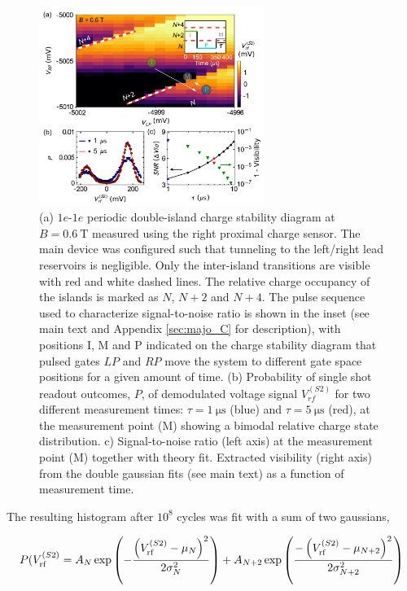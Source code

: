 \begin{figure}
	\includegraphics[width=0.65\textwidth]{Fig5-44.pdf}
	\caption[Charge sensitivity and signal-to-noise ratio]{(a) $1e$-$1e$ periodic double-island charge stability diagram at $B = \SI{0.6}{\tesla}$ measured using the right proximal charge sensor. The main device was configured such that tunneling to the left/right lead reservoirs is negligible. Only the inter-island transitions are visible with red and white dashed lines. The relative charge occupancy of the islands is marked as $N$, $N+2$ and $N+4$. The pulse sequence used to characterize signal-to-noise ratio is shown in the inset (see main text and Appendix \ref{sec:majo_C} for description), with positions I, M and P indicated on the charge stability diagram that pulsed gates $LP$ and $RP$ move the system to different gate space positions for a given amount of time. (b) Probability of single shot readout outcomes, $P$, of demodulated voltage signal $V^{(S2)}_{rf}$ for two different measurement times: $\tau = \SI{1}{\micro\second}$ (blue) and $\tau = \SI{5}{\micro\second}$ (red), at the measurement point (M) showing a bimodal relative charge state distribution. c) Signal-to-noise ratio (left axis) at the measurement point (M) together with theory fit. Extracted visibility (right axis) from the double gaussian fits (see main text) as a function of measurement time.}
	\label{fig:majo_e}
\end{figure}

The resulting histogram after $10^{8}$ cycles was fit with a sum of two gaussians,

\begin{equation}
\label{eq:gaussians}
P(V_\textrm{rf}^{(S2)} = A_{N}\exp\left(-\frac{\left(V_{\rm rf}^{(S2)}-\mu_{N}\right)^{2}}{2\sigma_{N}^{2}}\right)
						+ A_{N+2}\exp\left(\frac{-\left(V_{\rm rf}^{(S2)}-\mu_{N+2}\right)^{2}}{2\sigma_{N+2}^{2}}\right)
\end{equation}

